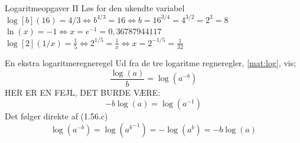 \begin{opgave}{Logaritmeopgaver II}
    Løs for den ukendte variabel
    \opg $\log[b](16) = 4/3 \iff b^{4/3}=16\iff b=16^{3/4}=4^{3/2}=2^3=8$
    \opg $\ln(x) = -1 \iff x=e^{-1}=0,36787944117$
    \opg $\log[2](1/x)=\frac{1}{5}\iff 2^{1/5}=\frac{1}{x}\iff x=2^{-1/5}=\frac{1}{32}$
\end{opgave}


\begin{opgave}{En ekstra logaritmeregneregel}
    Ud fra de tre logaritme regneregler, \eqref{mat:log}, vis;
    $$
    \frac{\log(a)}{b}=\log(a^{-b})
    $$
    HER ER EN FEJL, DET BURDE VÆRE:
    $$
    -b\log(a)=\log(a^{-1})
    $$
    Det følger direkte af (1.56.c)
    $$
        \log(a^{-b})=\log({a^b}^{-1})=-\log(a^b)=-b\log(a)
    $$
\end{opgave}